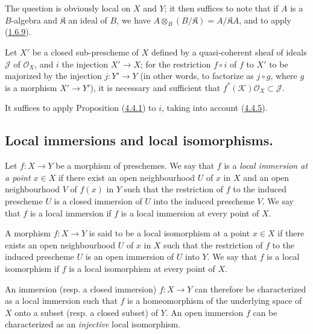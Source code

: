 The question is obviously local on $X$ and $Y$; it then suffices to
note that if $A$ is a $B$-algebra and $\mathfrak{K}$ an ideal of $B$,
we have $A\otimes_B(B/\mathfrak{K})=A/\mathfrak{K}A$, and to apply
(\hyperref[I.1.6.9]{1.6.9}).

\begin{corollary}[4.4.6]
\label{I.4.4.6}
Let $X'$ be a closed sub-prescheme of $X$ defined by a quasi-coherent
sheaf of ideals $\mathscr{J}$ of $\mathscr{O}_X$, and $i$ the injection
$X'\to X$; for the restriction $f\circ i$ of $f$ to $X'$ to be majorized
by the injection $j:Y'\to Y$ (in other words, to factorize as $j\circ g$,
where $g$ is a morphism $X'\to Y'$), it is necessary and sufficient that
$f^*(\mathscr{K})\mathscr{O}_X\subset\mathscr{J}$.
\end{corollary}

It suffices to apply Proposition (\hyperref[I.4.4.1]{4.4.1}) to $i$, taking
into account (\hyperref[I.4.4.5]{4.4.5}).

\subsection{Local immersions and local isomorphisms.}
\label{subsection:I.4.5}

\begin{definition}[4.5.1]
\label{I.4.5.1}
Let $f:X\to Y$ be a morphism of preschemes. We say that $f$ is a
\emph{local immersion at a point $x\in X$} if there exist an open
neighbourhood $U$ of $x$ in $X$ and an open neighbourhood $V$ of $f(x)$ in $Y$
such that the restriction of $f$ to the induced prescheme $U$ is a closed
immersion of $U$ into the induced prescheme $V$. We say that $f$ is a local
immersion if $f$ is a local immersion at every point of $X$.
\end{definition}

\begin{definition}[4.5.2]
\label{I.4.5.2}
A morphism $f:X\to Y$ is said to be a local isomorphism at
a point $x\in X$ if there exists an open neighbourhood $U$ of $x$ in $X$ such
that the restriction of $f$ to the induced prescheme $U$ is an open immersion
of $U$ into $Y$. We say that $f$ is a local isomorphism if $f$ is a
local isomorphism at every point of $X$.
\end{definition}

\begin{env}[4.5.3]
\label{I.4.5.3}
An immersion (resp. a closed immersion) $f:X\to Y$ can therefore be
characterized as a local immersion such that $f$ is a homeomorphism
of the underlying space of $X$ onto a subset (resp. a closed subset) of
$Y$. An open immersion $f$ can be characterized as an \emph{injective} local
isomorphism.
\end{env}

